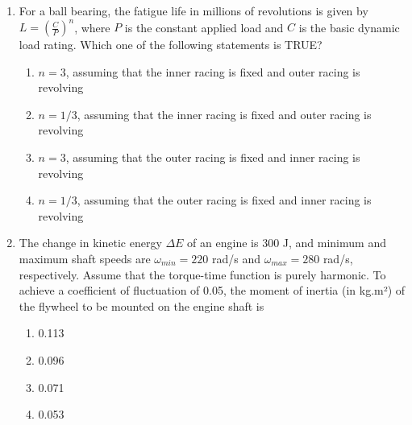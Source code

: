 \documentclass[journal,11pt,onecolumn]{IEEEtran}
\begin{document}
\begin{enumerate}[resume]
    \item For a ball bearing, the fatigue life in millions of revolutions is given by $L = \left(\frac{C}{P}\right)^{n}$, where $P$ is the constant applied load and $C$ is the basic dynamic load rating. Which one of the following statements is TRUE?

          \begin{enumerate}
              \item $n = 3$, assuming that the inner racing is fixed and outer racing is revolving
              \item $n = 1/3$, assuming that the inner racing is fixed and outer racing is revolving
              \item $n = 3$, assuming that the outer racing is fixed and inner racing is revolving
              \item $n = 1/3$, assuming that the outer racing is fixed and inner racing is revolving
          \end{enumerate}

    \item The change in kinetic energy $\Delta E$ of an engine is 300 J, and minimum and maximum shaft speeds are $\omega_{min} = 220$ rad/s and $\omega_{max} = 280$ rad/s, respectively. Assume that the torque-time function is purely harmonic. To achieve a coefficient of fluctuation of 0.05, the moment of inertia (in kg.m²) of the flywheel to be mounted on the engine shaft is

          \begin{enumerate}
              \item 0.113
              \item 0.096
              \item 0.071
              \item 0.053
          \end{enumerate}


\end{enumerate}
\end{document}
